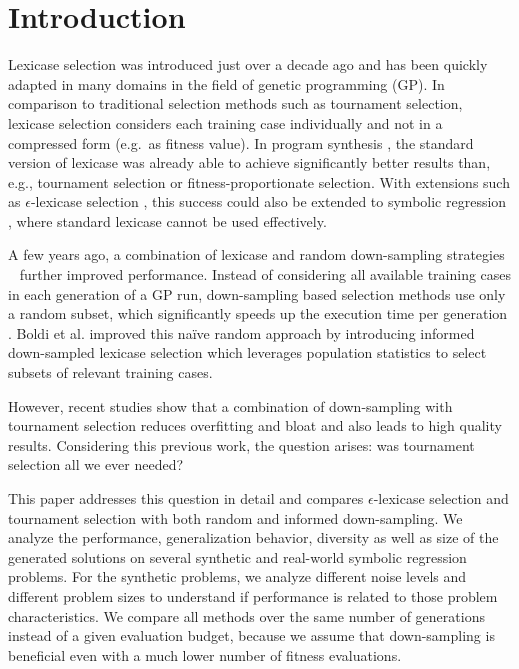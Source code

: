 \documentclass[runningheads]{llncs}
\begin{document}
\section{Introduction}
\label{sec:introduction}

Lexicase selection \cite{Spector.2012, Helmuth.2014} was introduced just over a decade ago and has been quickly adapted in many domains in the field of genetic programming (GP). In comparison to traditional selection methods such as tournament selection, lexicase selection considers each training case individually and not in a compressed form (e.g.~as fitness value). In program synthesis \cite{Helmuth.07082020, Helmuth.2015, Sobania.2023}, the standard version of lexicase was already able to achieve significantly better results than, e.g., tournament selection or fitness-proportionate selection. With extensions such as $\epsilon$-lexicase selection \cite{LaCava.2016, LaCava.2019}, this success could also be extended to symbolic regression \cite{Orzechowski.07022018}, where standard lexicase cannot be used effectively. 

A few years ago, a combination of lexicase and random down-sampling strategies ~\cite{geiger.2023, Hernandez.2019, Ferguson.2020} further improved performance. Instead of considering all available training cases in each generation of a GP run, down-sampling based selection methods use only a random subset, which significantly speeds up the execution time per generation \cite{Hernandez.2019}. Boldi et al. \cite{boldi2024informed} improved this na\"ive random approach by introducing  informed down-sampled lexicase selection which leverages population statistics to select subsets of relevant training cases. 

However, recent studies \cite{geiger2024lexicase, Goncalves.2012} show that a combination of down-sampling with tournament selection reduces overfitting and bloat and also leads to high quality results. Considering this previous work, the question arises: was tournament selection all we ever needed? 

This paper addresses this question in detail and compares $\epsilon$-lexicase selection and tournament selection with both random and informed down-sampling. We analyze the performance, generalization behavior, diversity as well as size of the generated solutions on several synthetic and real-world symbolic regression problems. For the synthetic problems, we analyze different noise levels and different problem sizes to understand if performance is related to those problem characteristics. We compare all methods over the same number of generations instead of a given evaluation budget, because we assume that down-sampling is beneficial even with a much lower number of fitness evaluations. 
\end{document}
